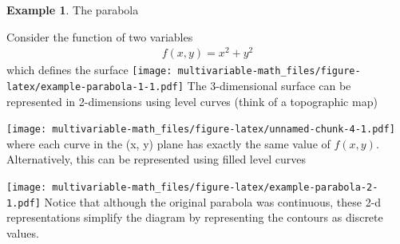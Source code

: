 \documentclass[
]{book}
\newenvironment{Shaded}{\begin{snugshade}}{\end{snugshade}}
\newcommand{\DataTypeTok}[1]{\textcolor[rgb]{0.13,0.29,0.53}{#1}}
\newcommand{\DecValTok}[1]{\textcolor[rgb]{0.00,0.00,0.81}{#1}}
\newcommand{\KeywordTok}[1]{\textcolor[rgb]{0.13,0.29,0.53}{\textbf{#1}}}
\newcommand{\NormalTok}[1]{#1}
\newcommand{\OperatorTok}[1]{\textcolor[rgb]{0.81,0.36,0.00}{\textbf{#1}}}
\newcommand{\StringTok}[1]{\textcolor[rgb]{0.31,0.60,0.02}{#1}}
\theoremstyle{definition}
\theoremstyle{definition}
\newtheorem{example}{Example}[chapter]
\theoremstyle{definition}
\theoremstyle{definition}
\theoremstyle{remark}
\begin{document}
\begin{example}
The parabola

Consider the function of two variables
\[
\begin{aligned}
f(x, y) = x^2 + y^2
\end{aligned}
\]
which defines the surface
\texttt{[image: multivariable-math\_files/figure-latex/example-parabola-1-1.pdf]}
The 3-dimensional surface can be represented in 2-dimensions using level curves (think of a topographic map)

\begin{Shaded}
\end{Shaded}

\texttt{[image: multivariable-math\_files/figure-latex/unnamed-chunk-4-1.pdf]}
where each curve in the (x, y) plane has exactly the same value of \(f(x, y)\). Alternatively, this can be represented using filled level curves

\begin{Shaded}
\end{Shaded}

\texttt{[image: multivariable-math\_files/figure-latex/example-parabola-2-1.pdf]}
Notice that although the original parabola was continuous, these 2-d representations simplify the diagram by representing the contours as discrete values.
\end{example}
\end{document}
